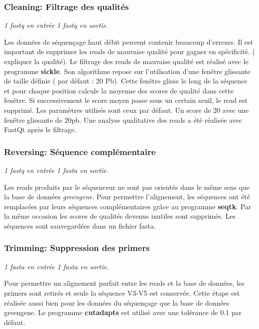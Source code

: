 \documentclass[12pt,a4paper]{article}
\begin{document}
\subsubsection{Cleaning: Filtrage des qualités}\begin{center}\emph{1 fastq en entrée 1 fastq en sortie. } \end{center}

Les données de séquençage haut débit peuvent contenir beaucoup d'erreurs. Il est important de supprimer les reads de mauvaise qualité pour gagner en spécificité. ( expliquer la qualité).
Le filtrage des reads de mauvaise qualité est réalisé avec le programme \textbf{sickle}. Son algorithme repose sur l'utilisation d'une fenêtre glissante de taille définie ( par défaut : 20 Pb). Cette fenêtre glisse le long de la séquence et pour chaque position calcule la moyenne des scores de qualité dans cette fenêtre. Si successivement le score moyen passe sous un certain seuil, le read est supprimé. Les paramètres utilisés sont ceux par défaut. Un score de 20 avec une fenêtre glissante de 20pb. 
Une analyse qualitative des reads a été réalisée avec FastQt\citep{Beck} après le filtrage. 


\subsubsection{Reversing: Séquence complémentaire}\begin{center}\emph{1 fastq en entrée 1 fasta en sortie. } \end{center}

Les reads produits par le séquenceur ne sont pas orientés dans le même sens que la base de données \textit{greengene}. Pour permettre l'alignement, les séquences ont été remplacées par leurs séquences complémentaires grâce au programme \textbf{seqtk}. 
Par la même occasion les scores de qualités devenus inutiles sont supprimés. Les séquences sont sauvegardées dans un fichier fasta. 

\subsubsection{Trimming: Suppression des primers} \begin{center}\emph{1 fasta en entrée 1 fasta en sortie. } \end{center}

Pour permettre un alignement parfait entre les reads et la base de données, les primers sont retirés et seule la séquence V3-V5 est conservée. Cette étape est réalisée aussi bien pour les données du séquençage que  la base de données greengene.  
Le programme \textbf{cutadapts} est utilisé avec une tolérance de 0.1 par défaut. 
\end{document}
